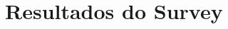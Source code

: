 \documentclass[twoside,english,brazilian]{UNISINOSartigo}
\begin{document}





\appendix





\section{Resultados do Survey}
\end{document}
